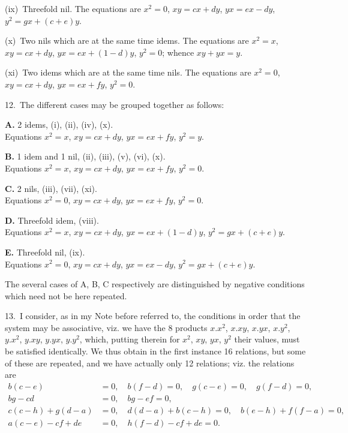 \documentclass[11pt,a4paper]{article}
\theoremstyle{plain}
\theoremstyle{definition}
\theoremstyle{remark}
\begin{document}
(ix)~Threefold nil. The equations are $x^2=0$, $xy=cx+dy$, $yx=ex-dy$, $y^2=gx+(c+e)y$.

(x)~Two nils which are at the same time idems. The equations are $x^2=x$, $xy=cx+dy$, $yx=ex+(1-d)y$, $y^2=0$; whence $xy+yx=y$.

(xi)~Two idems which are at the same time nils. The equations are $x^2=0$, $xy=cx+dy$, $yx=ex+fy$, $y^2=0$.

12.~The different cases may be grouped together as follows:

\begin{center}
\textbf{A.} 2 idems, (i), (ii), (iv), (x).\\[0.3em]
Equations $x^2=x$, $xy=cx+dy$, $yx=ex+fy$, $y^2=y$.

\medskip
\textbf{B.} 1 idem and 1 nil, (ii), (iii), (v), (vi), (x).\\[0.3em]
Equations $x^2=x$, $xy=cx+dy$, $yx=ex+fy$, $y^2=0$.

\medskip
\textbf{C.} 2 nils, (iii), (vii), (xi).\\[0.3em]
Equations $x^2=0$, $xy=cx+dy$, $yx=ex+fy$, $y^2=0$.

\medskip
\textbf{D.} Threefold idem, (viii).\\[0.3em]
Equations $x^2=x$, $xy=cx+dy$, $yx=ex+(1-d)y$, $y^2=gx+(c+e)y$.

\medskip
\textbf{E.} Threefold nil, (ix).\\[0.3em]
Equations $x^2=0$, $xy=cx+dy$, $yx=ex-dy$, $y^2=gx+(c+e)y$.
\end{center}

The several cases of A, B, C respectively are distinguished by negative conditions which need not be here repeated.

13.~I consider, as in my Note before referred to, the conditions in order that the system may be associative, viz. we have the 8 products $x.x^2$, $x.xy$, $x.yx$, $x.y^2$, $y.x^2$, $y.xy$, $y.yx$, $y.y^2$, which, putting therein for $x^2$, $xy$, $yx$, $y^2$ their values, must be satisfied identically. We thus obtain in the first instance 16 relations, but some of these are repeated, and we have actually only 12 relations; viz. the relations are
\begin{align*}
b(c-e) &= 0,\quad b(f-d)=0,\quad g(c-e)=0,\quad g(f-d)=0,\\
bg-cd &= 0,\quad bg-ef=0,\\
c(c-h)+g(d-a) &= 0,\quad d(d-a)+b(c-h)=0,\quad b(e-h)+f(f-a)=0,\\
a(c-e)-cf+de &= 0,\quad h(f-d)-cf+de=0.
\end{align*}
\end{document}
